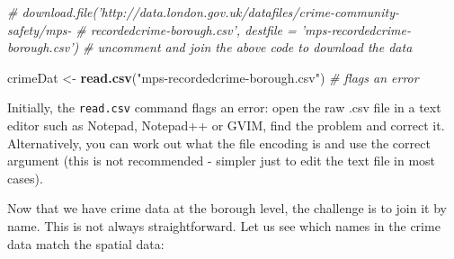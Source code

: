 \documentclass[]{article}
\newenvironment{Shaded}{}{}
\newcommand{\KeywordTok}[1]{\textcolor[rgb]{0.00,0.44,0.13}{\textbf{{#1}}}}
\newcommand{\DataTypeTok}[1]{\textcolor[rgb]{0.56,0.13,0.00}{{#1}}}
\newcommand{\DecValTok}[1]{\textcolor[rgb]{0.25,0.63,0.44}{{#1}}}
\newcommand{\StringTok}[1]{\textcolor[rgb]{0.25,0.44,0.63}{{#1}}}
\newcommand{\CommentTok}[1]{\textcolor[rgb]{0.38,0.63,0.69}{\textit{{#1}}}}
\newcommand{\NormalTok}[1]{{#1}}
\begin{document}
\begin{Shaded}
\begin{Highlighting}[]
\CommentTok{# download.file('http://data.london.gov.uk/datafiles/crime-community-safety/mps-}
\CommentTok{# recordedcrime-borough.csv', destfile = 'mps-recordedcrime-borough.csv')}
\CommentTok{# uncomment and join the above code to download the data}

\NormalTok{crimeDat <- }\KeywordTok{read.csv}\NormalTok{(}\StringTok{"mps-recordedcrime-borough.csv"}\NormalTok{)  }\CommentTok{# flags an error}
\end{Highlighting}
\end{Shaded}
Initially, the \texttt{read.csv} command flags an error: open the raw
.csv file in a text editor such as Notepad, Notepad++ or GVIM, find the
problem and correct it. Alternatively, you can work out what the file
encoding is and use the correct argument (this is not recommended -
simpler just to edit the text file in most cases).

\begin{Shaded}
\end{Shaded}
Now that we have crime data at the borough level, the challenge is to
join it by name. This is not always straightforward. Let us see which
names in the crime data match the spatial data:
\end{document}
